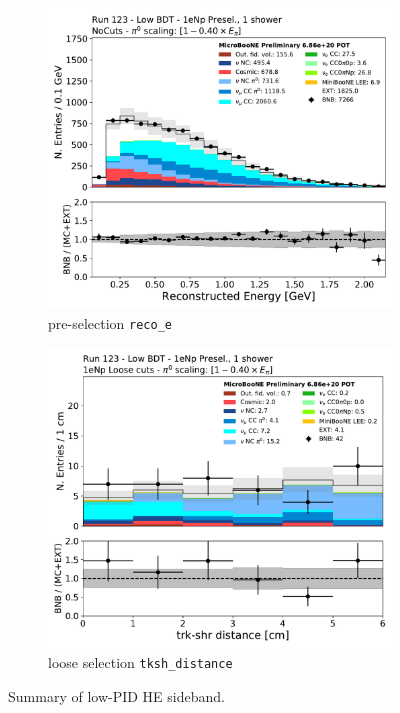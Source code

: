 \begin{figure}[H]
    \begin{center}
    \begin{subfigure}{0.45\textwidth}
    \includegraphics[width=1.00\textwidth]{Sidebands/Figures/1eNp/LPID_NPOneShr_None_pi0e40/reco_e.pdf}
    \caption{\label{fig:LPID_1eNp_reco_e} pre-selection \texttt{reco\_e}}
    \end{subfigure}
    \begin{subfigure}{0.45\textwidth}
    \includegraphics[width=1.00\textwidth]{Sidebands/Figures/1eNp/LPID_NPOneShr_None_pi0e40/tksh_distance_LPID.pdf}
    \caption{\label{fig:LPID_1eNp_tkshdist} loose selection \texttt{tksh\_distance}}
    \end{subfigure}
    \caption{Summary of low-PID HE sideband.}
    \end{center}
\end{figure}

